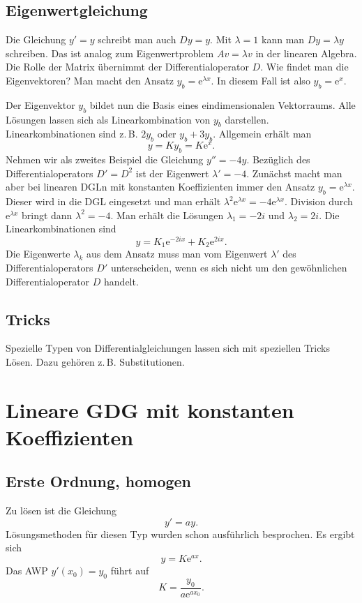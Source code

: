 \documentclass[a4paper,10pt,fleqn,twocolumn,twoside,openany]{article}
\numberwithin{equation}{section}
\newcommand{\ee}{\mathrm e}
\theoremstyle{definition}
\begin{document}
\subsection{Eigenwertgleichung}

Die Gleichung $y'=y$ schreibt man auch $Dy=y$. Mit $\lambda=1$
kann man $Dy=\lambda y$ schreiben. Das ist analog zum Eigenwertproblem
$Av=\lambda v$ in der linearen Algebra. Die Rolle der Matrix übernimmt
der Differentialoperator $D$. Wie findet man die Eigenvektoren?
Man macht den Ansatz $y_b=\ee^{\lambda x}$. In diesem Fall ist
also $y_b=\ee^x$.

Der Eigenvektor $y_b$ bildet nun die Basis eines eindimensionalen
Vektorraums. Alle Lösungen lassen sich als Linearkombination von $y_b$
darstellen. Linearkombinationen sind z.\,B. $2y_b$ oder $y_b+3y_b$.
Allgemein erhält man%
\begin{equation}
y = Ky_b = K\ee^x.
\end{equation}
Nehmen wir als zweites Beispiel die Gleichung $y''=-4y$. Bezüglich
des Differentialoperators $D'=D^2$ ist der Eigenwert $\lambda'=-4$.
Zunächst macht man aber bei linearen DGLn mit konstanten
Koeffizienten immer den Ansatz $y_b=\ee^{\lambda x}$. Dieser
wird in die DGL eingesetzt und man erhält
$\lambda^2 \ee^{\lambda x} = -4\ee^{\lambda x}$.
Division durch $\ee^{\lambda x}$ bringt dann $\lambda^2 = -4$.
Man erhält die Lösungen $\lambda_1 = -2i$ und $\lambda_2 = 2i$.
Die Linearkombinationen sind
\begin{equation}
y=K_1\ee^{-2ix}+K_2\ee^{2ix}.
\end{equation}
Die Eigenwerte $\lambda_k$ aus dem Ansatz muss man vom
Eigenwert $\lambda'$ des Differentialoperators $D'$ unterscheiden,
wenn es sich nicht um den gewöhnlichen Differentialoperator $D$
handelt.

\subsection{Tricks}
Spezielle Typen von Differentialgleichungen lassen sich mit
speziellen Tricks Lösen. Dazu gehören z.\,B. Substitutionen.

\section{Lineare GDG mit konstanten Koeffizienten}
\subsection{Erste Ordnung, homogen}
Zu lösen ist die Gleichung
\begin{equation}
y' = ay.
\end{equation}
Lösungsmethoden für diesen Typ wurden schon ausführlich besprochen.
Es ergibt sich
\begin{equation}
y = K\ee^{ax}.
\end{equation}
Das AWP $y'(x_0) = y_0$ führt auf
\begin{equation}
K=\frac{y_0}{a\ee^{ax_0}}.
\end{equation}
\end{document}
